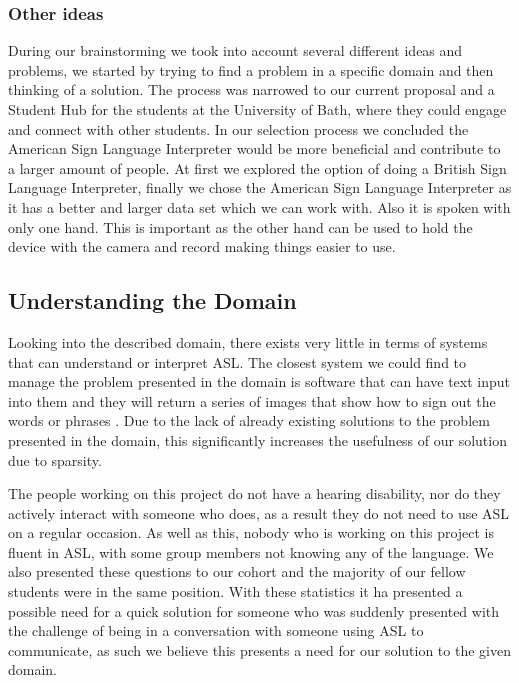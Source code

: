 \documentclass[10pt]{article}
\begin{document}
\subsubsection{Other ideas}

During our brainstorming we took into account several different ideas and problems, we started by 
trying to find a problem in a specific domain and then thinking of a solution. The process was 
narrowed to our current proposal and a Student Hub for the students at the University of Bath, where 
they could engage and connect with other students. In our selection process we concluded the 
American Sign Language Interpreter would be more beneficial and contribute to a larger amount of 
people. At first we explored the option of doing a British Sign Language Interpreter, finally we 
chose the American Sign Language Interpreter as it has a better and larger data set which we can 
work with. Also it is spoken with only one hand. This is important as the other hand can be used to 
hold the device with the camera and record making things easier to use. 

\subsection{Understanding the Domain}

Looking into the described domain, there exists very little in terms of systems that can understand 
or interpret ASL. The closest system we could find to manage the problem presented in the domain is 
software that can have text input into them and they will return a series of images that show how to 
sign out the words or phrases \cite{handtalk}. Due to the lack of already existing solutions to the 
problem presented in the domain, this significantly increases the usefulness of our solution due to 
sparsity.

The people working on this project do not have a hearing disability, nor do they actively interact 
with someone who does, as a result they do not need to use ASL on a regular occasion. As well as 
this, nobody who is working on this project is fluent in ASL, with some group members not knowing 
any of the language. We also presented these questions to our cohort and the majority of our fellow 
students were in the same position. With these statistics it ha presented a possible need for a 
quick solution for someone who was suddenly presented with the challenge of being in a conversation 
with someone using ASL to communicate, as such we believe this presents a need for our solution to 
the given domain.
\end{document}
